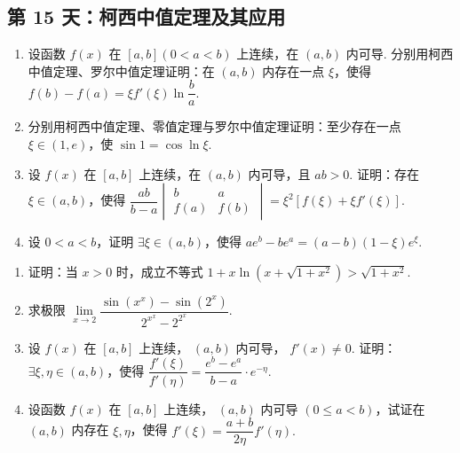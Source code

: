 \subsection*{第 15 天：柯西中值定理及其应用}
\vspace{1cm}

\begin{enumerate}[label=\textbf{\arabic*.}, itemsep=6cm]
    \item 设函数 $f(x)$ 在 $[a,b](0 < a < b)$ 上连续，在 $(a,b)$ 内可导. 分别用柯西中值定理、罗尔中值定理证明：在 $(a,b)$ 内存在一点 $\xi$，使得
    $ f(b) - f(a) = \xi f'(\xi) \ln \dfrac{b}{a}. $
    
    \item 分别用柯西中值定理、零值定理与罗尔中值定理证明：至少存在一点 $\xi \in (1,e)$，使 $\sin 1 = \cos\ln\xi$.
    
    \item 设 $f(x)$ 在 $[a,b]$ 上连续，在 $(a,b)$ 内可导，且 $ab > 0$. 证明：存在 $\xi \in (a,b)$，使得
    $ \dfrac{ab}{b-a} \begin{vmatrix} b & a \\ f(a) & f(b) \end{vmatrix} = \xi^2\left[f(\xi) + \xi f'(\xi)\right]. $
    
    \item 设 $0 < a < b$，证明 $\exists \xi \in (a,b)$，使得
    $ ae^b - be^a = (a-b)(1-\xi)e^\xi. $
\end{enumerate}

\newpage

\begin{enumerate}[label=\textbf{\arabic*.}, itemsep=6cm, resume]
    \item 证明：当 $x > 0$ 时，成立不等式
    $ 1 + x\ln\left(x + \sqrt{1+x^2}\right) > \sqrt{1+x^2}. $
    
    \item 求极限 $\lim\limits_{x \to 2} \dfrac{\sin\left(x^x\right) - \sin\left(2^x\right)}{2^{x^x} - 2^{2^x}}$.
    
    \item 设 $f(x)$ 在 $[a,b]$ 上连续， $(a,b)$ 内可导， $f'(x) \ne 0$. 证明：$\exists \xi, \eta \in (a,b)$，使得
    $ \dfrac{f'(\xi)}{f'(\eta)} = \dfrac{e^b - e^a}{b-a} \cdot e^{-\eta}. $
    
    \item 设函数 $f(x)$ 在 $[a,b]$ 上连续， $(a,b)$ 内可导 $(0 \le a < b)$，试证在 $(a,b)$ 内存在 $\xi, \eta$，使得
    $ f'(\xi) = \dfrac{a+b}{2\eta} f'(\eta). $
\end{enumerate}

